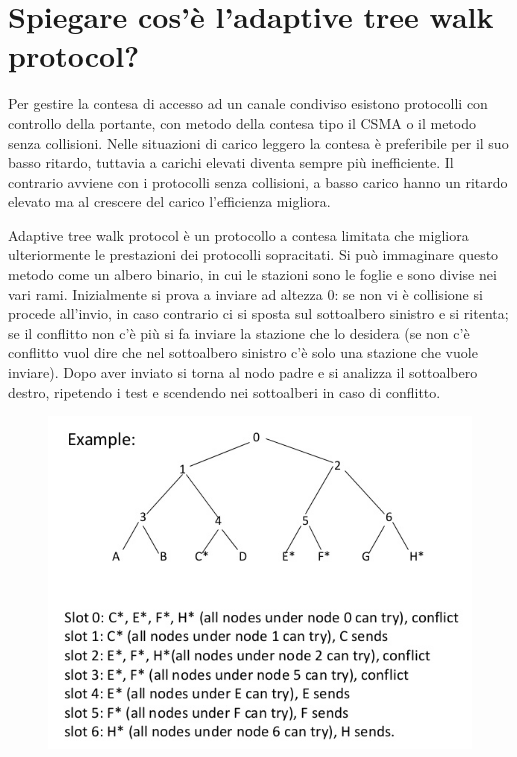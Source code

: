 \section{Spiegare cos’è l’adaptive tree walk protocol?}

Per gestire la contesa di accesso ad un canale condiviso esistono protocolli con controllo della portante, con metodo della contesa tipo il CSMA o il metodo senza collisioni. Nelle situazioni di carico leggero la contesa è preferibile per il suo basso ritardo, tuttavia a carichi elevati diventa sempre più inefficiente. Il contrario avviene con i protocolli senza collisioni, a basso carico hanno un ritardo elevato ma al crescere del carico l’efficienza migliora.

Adaptive tree walk protocol è un protocollo a contesa limitata che migliora ulteriormente le prestazioni dei protocolli sopracitati.
Si può immaginare questo metodo come un albero binario, in cui le stazioni sono le foglie e sono divise nei vari rami. Inizialmente si prova a inviare ad altezza 0: se non vi è collisione si procede all’invio, in caso contrario ci si sposta sul sottoalbero sinistro e si ritenta; se il conflitto non c’è più si fa inviare la stazione che lo desidera (se non c’è conflitto vuol dire che nel sottoalbero sinistro c’è solo una stazione che vuole inviare). Dopo aver inviato si torna al nodo padre e si analizza il sottoalbero destro, ripetendo i test e scendendo nei sottoalberi in caso di conflitto.

\begin{figure}[H]
\centering
\includegraphics[scale=0.7]{res/img/26_AdaptiveTreeProtocol.png}
\end{figure}
 

